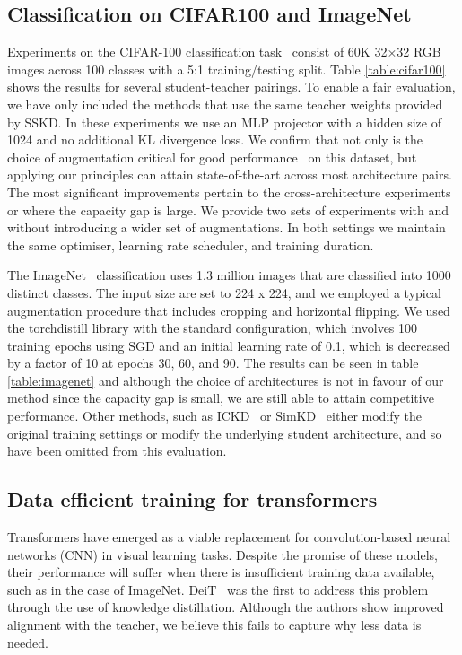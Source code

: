 \documentclass[letterpaper]{article} \usepackage[submission]{aaai23}  \usepackage{times}  \usepackage{helvet}  \usepackage{courier}  \usepackage[hyphens]{url}  \usepackage{graphicx} \urlstyle{rm} \def\UrlFont{\rm}  \usepackage{natbib}  \usepackage{caption} \frenchspacing  \setlength{\pdfpagewidth}{8.5in} \setlength{\pdfpageheight}{11in} \usepackage{algorithm}
\begin{document}
\subsection{Classification on CIFAR100 and ImageNet}
\label{sec:cifar_and_imagenet}
Experiments on the CIFAR-100 classification task~\cite{Krizhevsky2009LearningImages} consist of 60K 32×32 RGB images across
100 classes with a 5:1 training/testing split. Table \ref{table:cifar100} shows the results for several student-teacher pairings. To enable a fair evaluation, we have only included the methods that use the same teacher weights provided by SSKD\cite{Xu2020KnowledgeSelf-supervision}. In these experiments we use an MLP projector with a hidden size of 1024 and no additional KL divergence loss. We confirm that not only is the choice of augmentation critical for good performance~\cite{Beyer2022KnowledgeConsistent} on this dataset, but applying our principles can attain state-of-the-art across most architecture pairs. The most significant improvements pertain to the cross-architecture experiments or where the capacity gap is large. We provide two sets of experiments with and without introducing a wider set of augmentations. In both settings we maintain the same optimiser, learning rate scheduler, and training duration.



The ImageNet~\cite{Russakovsky2014ImageNetChallenge} classification uses 1.3 million images that are classified into 1000 distinct classes. The input size are set to 224 x 224, and we employed a typical augmentation procedure that includes cropping and horizontal flipping. We used the torchdistill library with the standard configuration, which involves 100 training epochs using SGD and an initial learning rate of 0.1, which is decreased by a factor of 10 at epochs 30, 60, and 90. The results can be seen in table \ref{table:imagenet} and although the choice of architectures is not in favour of our method since the capacity gap is small, we are still able to attain competitive performance. Other methods, such as ICKD~\cite{Liu2021ExploringDistillation} or SimKD~\cite{Chen2022KnowledgeClassifier} either modify the original training settings or modify the underlying student architecture, and so have been omitted from this evaluation.

\subsection{Data efficient training for transformers}
\label{sec:deit}
Transformers have emerged as a viable replacement for convolution-based neural networks (CNN) in visual learning tasks. Despite the promise of these models, their performance will suffer when there is insufficient training data available, such as in the case of ImageNet. DeiT~\cite{Touvron2021TrainingAttention} was the first to address this problem through the use of knowledge distillation. Although the authors show improved alignment with the teacher, we believe this fails to capture why less data is needed.
\end{document}
